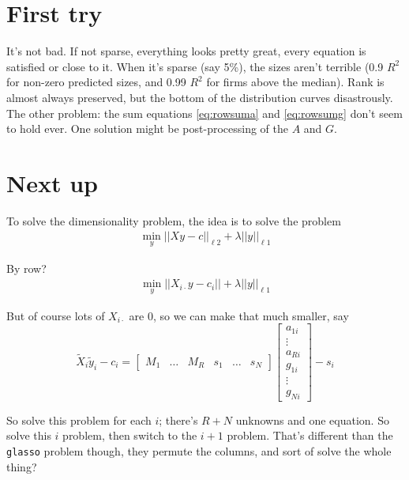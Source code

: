 \documentclass[11pt]{article}
\begin{document}
\section{First try}

It's not bad. If not sparse, everything looks pretty great, every equation is satisfied or close to it. When it's sparse (say 5\%), the sizes aren't terrible (0.9 $R^2$ for non-zero predicted sizes, and 0.99 $R^2$ for firms above the median). Rank is almost always preserved, but the bottom of the distribution curves disastrously. The other problem: the sum equations \eqref{eq:rowsuma} and \eqref{eq:rowsumg} don't seem to hold ever.  One solution might be post-processing of the $A$ and $G$.

\section{Next up}

To solve the dimensionality problem, the idea is to solve the problem
\begin{gather}
\min_y || X y - c||_{\ell 2} + \lambda || y ||_{\ell 1}
\end{gather}

By row?
\begin{gather}
\min_{y} || X_{i \cdot} y - c_i || + \lambda || y ||_{\ell 1} 
\end{gather}

But of course lots of $X_{i \cdot}$ are 0, so we can make that much smaller, say
\[
\tilde{X}_i \tilde{y}_i - c_i = 
\begin{bmatrix}
	M_1 & \dots & M_R & s_1 & \dots & s_N
\end{bmatrix}
\begin{bmatrix}
	a_{1i} \\
	\vdots \\
	a_{Ri} \\
	g_{1i} \\
	\vdots \\
	g_{Ni}
\end{bmatrix}
-
s_i
\]

So solve this problem for each $i$; there's $R+N$ unknowns and one equation. So solve this $i$ problem, then switch to the $i+1$ problem. That's different than the \texttt{glasso} problem though, they permute the columns, and sort of solve the whole thing?


\end{document}
